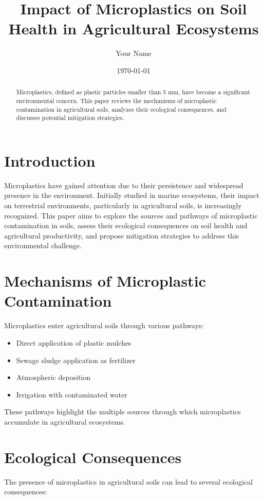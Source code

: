 \documentclass[12pt]{article}
\title{Impact of Microplastics on Soil Health in Agricultural Ecosystems}
\author{Your Name}
\date{\today}
\begin{document}
\maketitle

\begin{abstract}
Microplastics, defined as plastic particles smaller than 5 mm, have become a significant environmental concern. This paper reviews the mechanisms of microplastic contamination in agricultural soils, analyzes their ecological consequences, and discusses potential mitigation strategies.
\end{abstract}

\section{Introduction}
Microplastics have gained attention due to their persistence and widespread presence in the environment. Initially studied in marine ecosystems, their impact on terrestrial environments, particularly in agricultural soils, is increasingly recognized. This paper aims to explore the sources and pathways of microplastic contamination in soils, assess their ecological consequences on soil health and agricultural productivity, and propose mitigation strategies to address this environmental challenge.

\section{Mechanisms of Microplastic Contamination}
Microplastics enter agricultural soils through various pathways:

\begin{itemize}
    \item Direct application of plastic mulches
    \item Sewage sludge application as fertilizer
    \item Atmospheric deposition
    \item Irrigation with contaminated water
\end{itemize}

These pathways highlight the multiple sources through which microplastics accumulate in agricultural ecosystems.

\section{Ecological Consequences}
The presence of microplastics in agricultural soils can lead to several ecological consequences:
\end{document}
